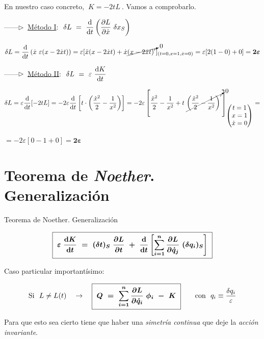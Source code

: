 En nuestro caso concreto, $\ K=-2tL\ $. Vamos a comprobarlo.

\vspace{5mm} ------$\triangleright \ $ \underline{Método I}: $\  \displaystyle \var L \ = \ \dv{t} \left( \pdv{L}{\dot x} \ \var x_S \right)$

$\displaystyle \var L=\dv{t} \left( \dot x \ \varepsilon (x-2\dot x t)\right)=\varepsilon[\ddot x(x-2\dot x t)+\dot x \cancelto{{0}}{(x-2\dot x t)'}]_{(t=0, x=1,\dot x=0)} =\varepsilon [2(1-0)+0]=\boldsymbol{2\varepsilon}$

\vspace{5mm} ------$\triangleright \ $ \underline{Método II}: $\ \displaystyle \var L \ = \ \varepsilon \ \dv{K}{t} $

$\var L=\varepsilon \displaystyle \dv{t} [-2tL]=-2\varepsilon \dv{t} \left[ t\cdot \left( \dfrac{\dot x^2}{2}-\dfrac 1 {x^2} \right) \right] =-2\varepsilon \left[ \dfrac{\dot x^2}{2}-\dfrac 1 {x^2} + t\ \cancelto{0}{\left( \dfrac{\dot x^2}{2} -\dfrac{1}{x^2} \right)'} \right]_{\mqty(t=1\\ x=1\\ \dot x=0)}=$

$=-2\varepsilon[0-1+0]=\boldsymbol{ 2\varepsilon}$

\section{Teorema de \emph{Noether}. Generalización}

\begin{myalertblock}{Teorema de Noether. Generalización}
	
	\vspace{5mm}
	\begin{large}
	\begin{equation}
	\label{T15TNoetherG}
	\boxed{ \ \boldsymbol{
	\varepsilon \ \dv{K}{t} \ = \ (\var t)_S\ \pdv{L}{t} \ + \ \dv{t} \left[ \sum_{i=1}^n \pdv{L}{\dot q_j} \ (\var q_i)_S \right]
	} \ }	
	\end{equation}
	\end{large}
	
	\vspace{5mm} Caso particular importantísimo:
	

	\begin{equation}
		\text{Si } \ L\neq L(t) \quad \to \quad
		\boldsymbol{
		\boxed{ \ 
		Q \ = \ \sum_{i=1}^n \pdv{L}{\dot q_i} \ \phi_i \ - \ K
		\ }
		} \qquad \text{con } \ q_i\equiv \dfrac{\var q_i}{\varepsilon}
  	\end{equation}

\vspace{5mm} Para que esto sea cierto tiene que haber una \emph{simetría continua} que deje la 	\emph{acción invariante}. \vspace{2mm}
\end{myalertblock}


